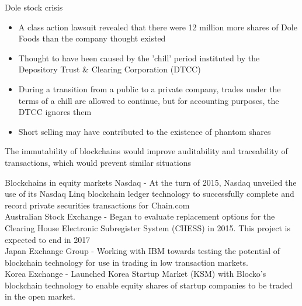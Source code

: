 \documentclass[9pt]{beamer}
\begin{document}


\begin{frame}{Dole stock crisis}
	\begin{itemize}
		\item A class action lawsuit revealed that there were 12 million more shares of Dole Foods than the company thought existed
		\item Thought to have been caused by the 'chill' period instituted by the Depository Trust \& Clearing Corporation (DTCC)
		\item During a transition from a public to a private company, trades under the terms of a chill are allowed to continue, but for accounting purposes, the DTCC ignores them
		\item Short selling may have contributed to the existence of phantom shares
	\end{itemize}
	The immutability of blockchains would improve auditability and traceability of transactions, which would prevent similar situations
\end{frame}



\begin{frame}{Blockchains in equity markets}
	Nasdaq - At the turn of 2015, Nasdaq unveiled the use of its Nasdaq Linq blockchain ledger technology to successfully complete and record private securities transactions for Chain.com\\ \vspace{3mm}
	Australian Stock Exchange - Began to evaluate replacement options for the Clearing House Electronic Subregister System (CHESS) in 2015. This project is expected to end in 2017\\ \vspace{3mm}
	Japan Exchange Group - Working with IBM towards testing the potential of blockchain technology for use in trading in low transaction markets.\\ \vspace{3mm}
	Korea Exchange -  Launched Korea Startup Market (KSM) with Blocko's blockchain technology to enable equity shares of startup companies to be traded in the open market.\\ \vspace{3mm}
\end{frame}
\end{document}
